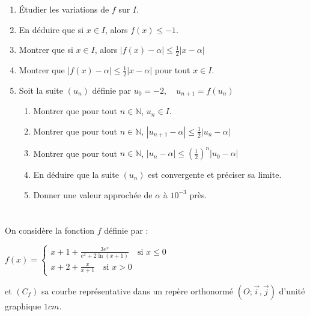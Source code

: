 \documentclass[12pt,a4paper]{article}
\begin{document}
\begin{enumerate}
    \item Étudier les variations de \( f \) sur \( I \).
    \item En déduire que si \( x \in I \), alors \( f(x) \leq -1 \).
    \item Montrer que si \( x \in I \), alors \( |f(x) - \alpha| \leq \frac{1}{2} |x - \alpha| \)
    \item Montrer que \( |f(x) - \alpha| \leq \frac{1}{2} |x - \alpha| \)
    pour tout \( x \in I \).
    \item Soit la suite \( (u_n) \) définie par \( u_0 = -2, \quad u_{n+1} = f(u_n) \)
    \begin{enumerate}
        \item Montrer que pour tout \( n \in \mathbb{N} \), \( u_n \in I \).
        \item Montrer que pour tout \( n \in \mathbb{N} \), \( |u_{n+1} - \alpha| \leq \frac{1}{2} |u_n - \alpha|\)
        \item Montrer que pour tout \( n \in \mathbb{N} \), \( |u_n - \alpha| \leq \left( \frac{1}{2} \right)^n |u_0 - \alpha| \)
        \item En déduire que la suite \( (u_n) \) est convergente et préciser sa limite.
        \item Donner une valeur approchée de \( \alpha \) à \( 10^{-3} \) près.
    \end{enumerate}
\end{enumerate}

\section*{} 

On considère la fonction \( f \) définie par :  

\( f(x) =  
\begin{cases}  
x + 1 + \frac{3e^x}{e^x + 2 \ln(x+1)} \quad \text{si } x \leq 0 \\  
x + 2 + \frac{x}{x+1} \quad \text{si } x > 0  
\end{cases} \)  

et \( (C_f) \) sa courbe représentative dans un repère orthonormé \( (O; \vec{i}, \vec{j}) \) d’unité graphique \( 1cm \).
\end{document}

